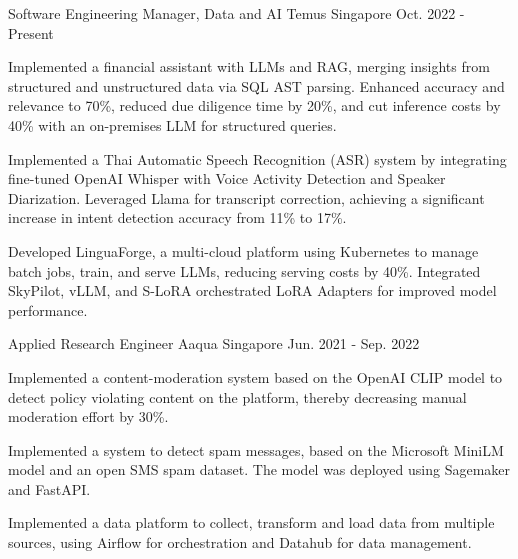 

\begin{cventries}

  \cventry
    {Software Engineering Manager, Data and AI} %
    {Temus} %
    {Singapore} %
    {Oct. 2022 - Present} %
    {
      \begin{cvitems} %
        \item {Implemented a financial assistant with LLMs and RAG, merging insights from structured and unstructured data via SQL AST parsing. Enhanced accuracy and relevance to 70\%, reduced due diligence time by 20\%, and cut inference costs by 40\% with an on-premises LLM for structured queries.}
        \item{Implemented a Thai Automatic Speech Recognition (ASR) system by integrating fine-tuned OpenAI Whisper with Voice Activity Detection and Speaker Diarization. Leveraged Llama for transcript correction, achieving a significant increase in intent detection accuracy from 11\% to 17\%.}
        \item{Developed LinguaForge, a multi-cloud platform using Kubernetes to manage batch jobs, train, and serve LLMs, reducing serving costs by 40\%. Integrated SkyPilot, vLLM, and S-LoRA orchestrated LoRA Adapters for improved model performance.}
      \end{cvitems}
    }

  \cventry
    {Applied Research Engineer} %
    {Aaqua} %
    {Singapore} %
    {Jun. 2021  - Sep. 2022} %
    {
      \begin{cvitems} %
        \item {Implemented a content-moderation system based on the OpenAI CLIP model to detect policy violating content on the platform, thereby decreasing manual moderation effort by 30\%. }
        \item {Implemented a system to detect spam messages, based on the Microsoft MiniLM model and an open SMS spam dataset. The model was deployed using Sagemaker and FastAPI.}
        \item {Implemented a data platform to collect, transform and load data from multiple sources, using Airflow for orchestration and Datahub for data management.}
      \end{cvitems}
    }


\end{cventries}
